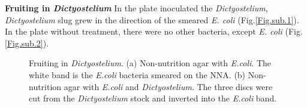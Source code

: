 \textbf{Fruiting in \textsl{Dictyostelium}} In the plate inoculated the \textsl{Dictyostelium}, \textsl{Dictyostelium} slug grew in the direction of the smeared \textsl{E. coli} (Fig.\ref{Fig.sub.1}). In the plate without treatment, there were no other bacteria, except \textsl{E. coli} (Fig.\ref{Fig.sub.2}).

\begin{figure}[H]
    \centering
    \caption{Fruiting in \textsl{Dictyostelium}. (a) Non-nutrition agar with \textsl{E.coli}. The white band is the \textsl{E.coli} bacteria smeared on the NNA. (b) Non-nutrition agar with \textsl{E.coli} and \textsl{Dictyostelium}. The three discs were cut from the \textsl{Dictyostelium} stock and inverted into the \textsl{E.coli} band.}
    \label{fig:my_label}
\end{figure}
